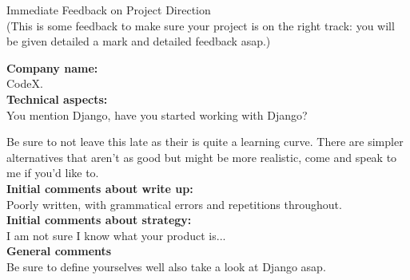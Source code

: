\documentclass{article}
\begin{document}
\begin{center}
\Huge{Immediate Feedback on Project Direction}\\
\tiny{(This is some feedback to make sure your project is on the right track: you will be given detailed a mark and detailed feedback asap.)}
\end{center}


\normalsize
\textbf{Company name:}\\

CodeX. \\

\textbf{Technical aspects:}\\

You mention Django, have you started working with Django?

Be sure to not leave this late as their is quite a learning curve. There are simpler alternatives that aren't as good but might be more realistic, come and speak to me if you'd like to.\\

\textbf{Initial comments about write up:}\\

Poorly written, with grammatical errors and repetitions throughout.\\

\textbf{Initial comments about strategy:}\\

I am not sure I know what your product is...\\

\textbf{General comments}\\

Be sure to define yourselves well also take a look at Django asap.
\end{document}
